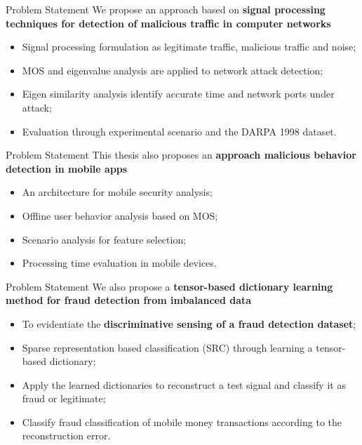 \documentclass[newPxFont, numfooter, sectionpages]{beamer}
\begin{document}
\begin{frame}[c]{Problem Statement}
	We propose an approach based on \textbf{signal processing techniques for detection of malicious traffic in computer networks}
	\begin{itemize}
		\item Signal processing formulation as legitimate traffic, malicious traffic and noise;
		\item MOS and eigenvalue analysis are applied to network attack detection;
		\item Eigen similarity analysis identify accurate time and network ports under attack;
		\item Evaluation through experimental scenario and the DARPA 1998 dataset.
	\end{itemize}
\end{frame}
\begin{frame}[c]{Problem Statement}
	This thesis also proposes an \textbf{approach malicious behavior detection in mobile apps}
	\begin{itemize}
		\item An architecture for mobile security analysis;
		\item Offline user behavior analysis based on MOS;
		\item Scenario analysis for feature selection;
		\item Processing time evaluation in mobile devices.
	\end{itemize}
\end{frame}
\begin{frame}[c]{Problem Statement}
	We also propose a \textbf{tensor-based dictionary learning method for fraud detection from imbalanced data} 
	\begin{itemize}
		\item To evidentiate the \textbf{discriminative sensing of a fraud detection dataset};
		\item Sparse representation based classification (SRC) through learning a tensor-based dictionary;
		\item Apply the learned dictionaries to reconstruct a test signal and classify it as fraud or legitimate;
		\item Classify fraud classification of mobile money transactions according to the reconstruction error.
	\end{itemize}
\end{frame}
\end{document}
